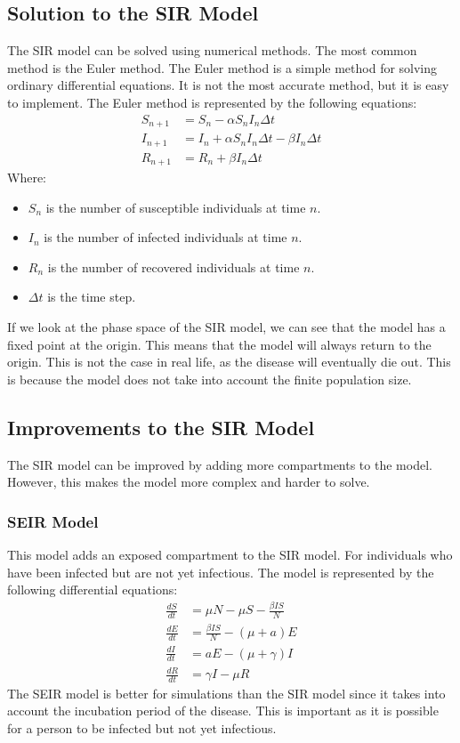 \documentclass{report}
\begin{document}
\subsection{Solution to the SIR Model}
The SIR model can be solved using numerical methods. The most common method is the Euler method. The Euler method is a simple method for solving ordinary differential equations. It is not the most accurate method, but it is easy to implement. The Euler method is represented by the following equations:
\begin{align}
S_{n+1} &= S_n - \alpha S_n I_n \Delta t \label{sir_euler_S} \\
I_{n+1} &= I_n + \alpha S_n I_n \Delta t - \beta I_n \Delta t \label{sir_euler_I} \\
R_{n+1} &= R_n + \beta I_n \Delta t \label{sir_euler_R}
\end{align}
Where:
\begin{itemize}
    \item $S_n$ is the number of susceptible individuals at time $n$.
    \item $I_n$ is the number of infected individuals at time $n$.
    \item $R_n$ is the number of recovered individuals at time $n$.
    \item $\Delta t$ is the time step.
\end{itemize}
If we look at the phase space of the SIR model, we can see that the model has a fixed point at the origin. This means that the model will always return to the origin. This is not the case in real life, as the disease will eventually die out. This is because the model does not take into account the finite population size.
\subsection{Improvements to the SIR Model}
The SIR model can be improved by adding more compartments to the model. However, this makes the model more complex and harder to solve.
\subsubsection{SEIR Model}
This model adds an exposed compartment to the SIR model. For individuals who have been infected but are not yet infectious. The model is represented by the following differential equations:
\begin{align}
\frac{dS}{dt} &= \mu N - \mu S - \frac{\beta IS}{N} \label{seir_model_dS} \\
\frac{dE}{dt} &= \frac{\beta IS}{N} - (\mu + a)E \label{seir_model_dE} \\
\frac{dI}{dt} &= aE - (\mu + \gamma)I \label{seir_model_dI} \\
\frac{dR}{dt} &= \gamma I - \mu R \label{seir_model_dR}
\end{align}
The SEIR model is better for simulations than the SIR model since it takes into account the incubation period of the disease. This is important as it is possible for a person to be infected but not yet infectious.\\
\end{document}
